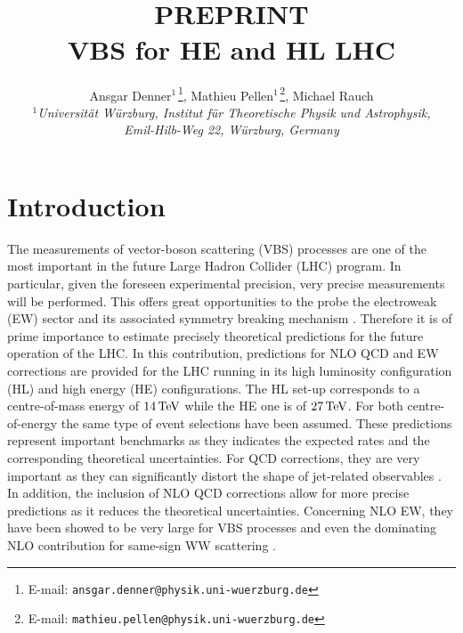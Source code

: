 \documentclass[11pt,epsf]{article}
\newcommand{\MP}[1]{{ {\color{blue}{ [MP: #1]}} }}
\begin{document}
\title{\hfill ~\\[-30mm]
\phantom{h} \hfill\mbox{\small PREPRINT}
\\[1cm]
\vspace{13mm}   \textbf{VBS for HE and HL LHC}}

\date{}
\author{
Ansgar Denner$^{1\,}$\footnote{E-mail:
  \texttt{ansgar.denner@physik.uni-wuerzburg.de}},
Mathieu Pellen$^{1\,}$\footnote{E-mail:
  \texttt{mathieu.pellen@physik.uni-wuerzburg.de}},
Michael Rauch
\\[9mm]
{\small\it
$^1$Universit\"at W\"urzburg, %
        Institut f\"ur Theoretische Physik und Astrophysik,} \\ %
{\small\it Emil-Hilb-Weg 22,  W\"urzburg, %
        Germany}\\[3mm]
}

\maketitle

\begin{abstract}
\noindent

\end{abstract}
\thispagestyle{empty}
\vfill
\newpage
\setcounter{page}{1}

\tableofcontents
\newpage


\section{Introduction}

The measurements of vector-boson scattering (VBS) processes are one of the most important in the future Large Hadron Collider (LHC) program.
In particular, given the foreseen experimental precision, very precise measurements will be performed.
This offers great opportunities to the probe the electroweak (EW) sector and its associated symmetry breaking mechanism \cite{Jager:2017owh} \MP{Other HE/HL studies?}.
Therefore it is of prime importance to estimate precisely theoretical predictions for the future operation of the LHC.
In this contribution, predictions for NLO QCD and EW corrections are provided for the LHC running in its high luminosity configuration (HL) and high energy (HE) configurations.
The HL set-up corresponds to a centre-of-mass energy of $14\,\text{TeV}$ while the HE one is of $27\,\text{TeV}$.
For both centre-of-energy the same type of event selections have been assumed.
These predictions represent important benchmarks as they indicates the expected rates and the corresponding theoretical uncertainties.
For QCD corrections, they are very important as they can significantly distort the shape of jet-related observables \cite{Jager:2006zc,Jager:2006cp,Bozzi:2007ur,Jager:2009xx,Jager:2011ms,Denner:2012dz,Rauch:2016pai} \MP{More?}.
In addition, the inclusion of NLO QCD corrections allow for more precise predictions as it reduces the theoretical uncertainties.
Concerning NLO EW, they have been showed to be very large for VBS processes \cite{Biedermann:2016yds} and even the dominating NLO contribution for same-sign WW scattering \cite{Biedermann:2017bss}.
\end{document}
